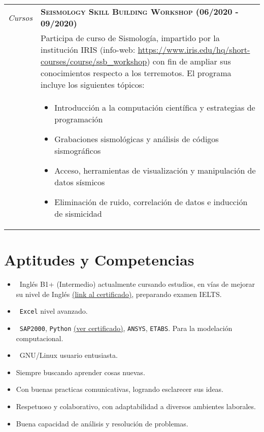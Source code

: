 \documentclass[latterpaper]{article}
\newenvironment{twocollist}{
    \begin{multicols}{2}
    \begin{itemize}
    }{
    \end{itemize}
    \end{multicols}
}
\begin{document}
\begin{tabular}{r p{14.0 cm}}	
\emph{\phantom{cincó}Cursos} & \textbf{\textsc{Seismology Skill Building Workshop (06/2020 - 09/2020)}}\\
& Participa de curso de Sismología, impartido por la institución IRIS (info-web: \url{https://www.iris.edu/hq/short-courses/course/ssb_workshop}) con fin de ampliar sus conocimientos respecto a los terremotos. El programa incluye los siguientes tópicos:\\
&
\begin{itemize}
\item Introducción a la computación científica y estrategias de programación
\item Grabaciones sismológicas y análisis de códigos sismográficos
\item Acceso, herramientas de visualización y manipulación de datos sísmicos
\item Eliminación de ruido, correlación de datos e inducción de sismicidad
  \end{itemize}\\
  \end{tabular}

\section{Aptitudes y Competencias}

  \begin{twocollist}
            \item \faLanguage~Inglés B1+ (Intermedio) actualmente cursando estudios, en vías de mejorar su nivel de Inglés \href{https://github.com/Inav92}{(link al certificado)}, preparando examen IELTS.
            \item \faFileExcelO~\texttt{Excel} nivel avanzado.
            \item \faCode~\texttt{SAP2000}, \texttt{Python} \href{https://coursera.org/share/07ea9a609345e33b5b1b5b0e33925258}{(ver certificado)}, \texttt{ANSYS}, \texttt{ETABS}. Para la modelación computacional.
            \item \faLinux~GNU/Linux usuario entusiasta.
            \item Siempre buscando aprender cosas nuevas.
            \item Con buenas practicas comunicativas, logrando esclarecer sus ideas.
            \item Respetuoso y colaborativo, con adaptabilidad a diversos ambientes laborales.
            \item Buena capacidad de análisis y resolución de problemas.
  \end{twocollist}
\end{document}
